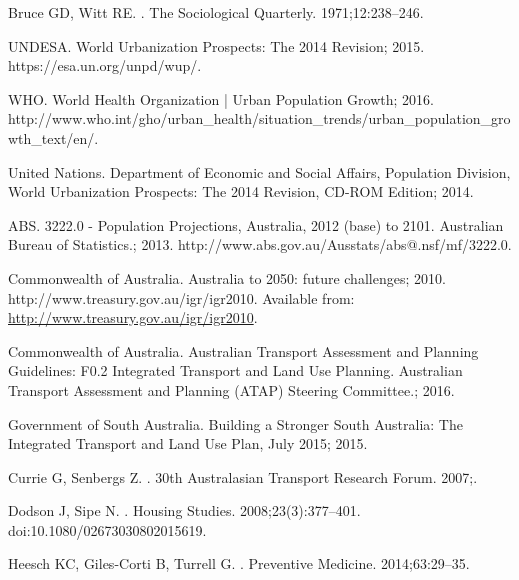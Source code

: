 Bruce GD, Witt RE.
.
\newblock The Sociological Quarterly. 1971;12:238--246.

UNDESA. {World Urbanization Prospects: The 2014 Revision}; 2015.
\newblock https://esa.un.org/unpd/wup/.

WHO. {World Health Organization | Urban Population Growth}; 2016.
\newblock
  http://www.who.int/gho/urban{\_}health/situation{\_}trends/urban{\_}population{\_}growth{\_}text/en/.

{United Nations}. {Department of Economic and Social Affairs, Population
  Division, World Urbanization Prospects: The 2014 Revision, CD-ROM Edition};
  2014.

ABS. {3222.0 - Population Projections, Australia, 2012 (base) to 2101.
  Australian Bureau of Statistics.}; 2013.
\newblock http://www.abs.gov.au/Ausstats/abs@.nsf/mf/3222.0.

{Commonwealth of Australia}. {Australia to 2050: future challenges}; 2010.
\newblock http://www.treasury.gov.au/igr/igr2010.
\newblock Available from: \url{http://www.treasury.gov.au/igr/igr2010}.

{Commonwealth of Australia}. {Australian Transport Assessment and Planning
  Guidelines: F0.2 Integrated Transport and Land Use Planning. Australian
  Transport Assessment and Planning (ATAP) Steering Committee.}; 2016.

{Government of South Australia}. {Building a Stronger South Australia: The
  Integrated Transport and Land Use Plan, July 2015}; 2015.

Currie G, Senbergs Z.
.
\newblock 30th Australasian Transport Research Forum. 2007;.

Dodson J, Sipe N.
.
\newblock Housing Studies. 2008;23(3):377--401.
\newblock doi:{10.1080/02673030802015619}.

Heesch KC, Giles-Corti B, Turrell G.
.
\newblock Preventive Medicine. 2014;63:29--35.

